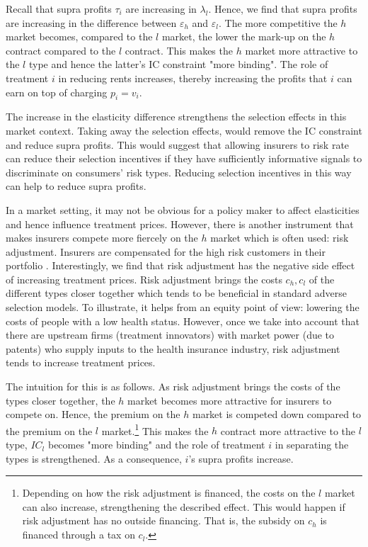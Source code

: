 \documentclass[12pt,english,a4paper]{article}
\begin{document}
Recall that supra profits \(\tau_i\) are increasing in \(\lambda_l\). Hence, we find that supra profits are increasing in the difference between \(\varepsilon_h\) and \(\varepsilon_l\). The more competitive the \(h\) market becomes, compared to the \(l\) market, the lower the mark-up on the \(h\) contract compared to the \(l\) contract. This makes the \(h\) market more attractive to the \(l\) type and hence the latter's IC constraint "more binding". The role of treatment \(i\) in reducing rents increases, thereby increasing the profits that \(i\) can earn on top of charging \(p_i=v_i\).

The increase in the elasticity difference strengthens the selection effects in this market context. Taking away the selection effects, would remove the IC constraint and reduce supra profits. This would suggest that allowing insurers to risk rate can reduce their selection incentives if they have sufficiently informative signals to discriminate on consumers' risk types. Reducing selection incentives in this way can help to reduce supra profits.

In a market setting, it may not be obvious for a policy maker to affect elasticities and hence influence treatment prices. However, there is another instrument that makes insurers compete more fiercely on the \(h\) market which is often used: risk adjustment. Insurers are compensated for the high risk customers in their portfolio \citep{vandevenellis2000}. Interestingly, we find that risk adjustment has the negative side effect of increasing treatment prices. Risk adjustment brings the costs \(c_h,c_l\) of the different types closer together which tends to be beneficial in standard adverse selection models. To illustrate, it helps from an equity point of view: lowering the costs of people with a low health status. However, once we take into account that there are upstream firms (treatment innovators) with market power (due to patents) who supply inputs to the health insurance industry, risk adjustment tends to increase treatment prices.

The intuition for this is as follows. As risk adjustment brings the costs of the types closer together, the \(h\) market becomes more attractive for insurers to compete on. Hence, the premium on the \(h\) market is competed down compared to the premium on the \(l\) market.\footnote{Depending on how the risk adjustment is financed, the costs on the \(l\) market can also increase, strengthening the described effect. This would happen if risk adjustment has no outside financing. That is, the subsidy on \(c_h\) is financed through a tax on \(c_l\).} This makes the \(h\) contract more attractive to the \(l\) type, \(IC_l\) becomes "more binding" and the role of treatment \(i\) in separating the types is strengthened. As a consequence, \(i\)'s supra profits increase.
\end{document}
